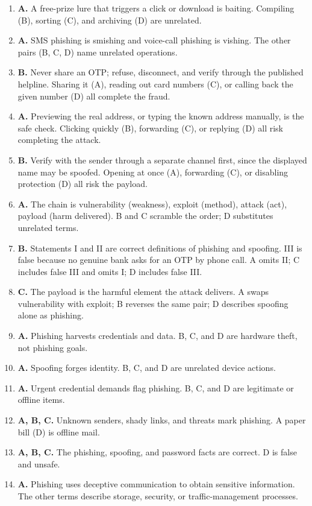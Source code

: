 \begin{enumerate}[label=\textbf{Q\arabic*.}, leftmargin=*]
  pretexting. Caching (B), indexing (C), and backing up (D) are
  unrelated.
\item \textbf{A.} A free-prize lure that triggers a click or download
  is baiting. Compiling (B), sorting (C), and archiving (D) are
  unrelated.
\item \textbf{A.} SMS phishing is smishing and voice-call phishing is
  vishing. The other pairs (B, C, D) name unrelated operations.
\item \textbf{B.} Never share an OTP; refuse, disconnect, and verify
  through the published helpline. Sharing it (A), reading out card
  numbers (C), or calling back the given number (D) all complete the
  fraud.
\item \textbf{A.} Previewing the real address, or typing the known
  address manually, is the safe check. Clicking quickly (B), forwarding
  (C), or replying (D) all risk completing the attack.
\item \textbf{B.} Verify with the sender through a separate channel
  first, since the displayed name may be spoofed. Opening at once (A),
  forwarding (C), or disabling protection (D) all risk the payload.
\item \textbf{A.} The chain is vulnerability (weakness), exploit
  (method), attack (act), payload (harm delivered). B and C scramble
  the order; D substitutes unrelated terms.
\item \textbf{B.} Statements I and II are correct definitions of
  phishing and spoofing. III is false because no genuine bank asks for
  an OTP by phone call. A omits II; C includes false III and omits I;
  D includes false III.
\item \textbf{C.} The payload is the harmful element the attack
  delivers. A swaps vulnerability with exploit; B reverses the same
  pair; D describes spoofing alone as phishing.

\item \textbf{A.} Phishing harvests credentials and data. B, C, and D are hardware theft, not phishing goals.
\item \textbf{A.} Spoofing forges identity. B, C, and D are unrelated device actions.
\item \textbf{A.} Urgent credential demands flag phishing. B, C, and D are legitimate or offline items.
\item \textbf{A, B, C.} Unknown senders, shady links, and threats mark phishing. A paper bill (D) is offline mail.
\item \textbf{A, B, C.} The phishing, spoofing, and password facts are correct. D is false and unsafe.
\item \textbf{A.} Phishing uses deceptive communication to obtain sensitive information. The other terms describe storage, security, or traffic-management processes.


\end{enumerate}
